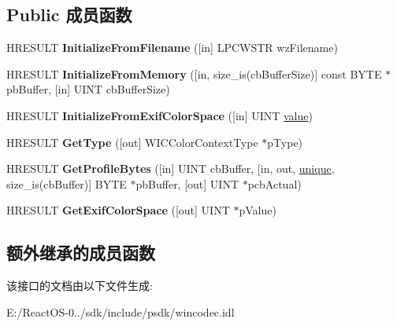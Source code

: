 \subsection*{Public 成员函数}
\begin{DoxyCompactItemize}
\item 
\mbox{\label{interface_i_w_i_c_color_context_a33b755754b61a614cfab71e7ec3b71b7}} 
H\+R\+E\+S\+U\+LT {\bfseries Initialize\+From\+Filename} (\mbox{[}in\mbox{]} L\+P\+C\+W\+S\+TR wz\+Filename)
\item 
\mbox{\label{interface_i_w_i_c_color_context_a5f5ce7e6cc3ca145ab4a6ae6b6e29629}} 
H\+R\+E\+S\+U\+LT {\bfseries Initialize\+From\+Memory} (\mbox{[}in, size\+\_\+is(cb\+Buffer\+Size)\mbox{]} const B\+Y\+TE $\ast$pb\+Buffer, \mbox{[}in\mbox{]} U\+I\+NT cb\+Buffer\+Size)
\item 
\mbox{\label{interface_i_w_i_c_color_context_a8ef3b21cf5aa20e3fb28a9942c3ac008}} 
H\+R\+E\+S\+U\+LT {\bfseries Initialize\+From\+Exif\+Color\+Space} (\mbox{[}in\mbox{]} U\+I\+NT \hyperlink{unionvalue}{value})
\item 
\mbox{\label{interface_i_w_i_c_color_context_aa76a3b69fbe11c66cfc87f72d564284a}} 
H\+R\+E\+S\+U\+LT {\bfseries Get\+Type} (\mbox{[}out\mbox{]} W\+I\+C\+Color\+Context\+Type $\ast$p\+Type)
\item 
\mbox{\label{interface_i_w_i_c_color_context_a0ebb1f6705c7f7e39c38c2f3e654e1dd}} 
H\+R\+E\+S\+U\+LT {\bfseries Get\+Profile\+Bytes} (\mbox{[}in\mbox{]} U\+I\+NT cb\+Buffer, \mbox{[}in, out, \hyperlink{interfaceunique}{unique}, size\+\_\+is(cb\+Buffer)\mbox{]} B\+Y\+TE $\ast$pb\+Buffer, \mbox{[}out\mbox{]} U\+I\+NT $\ast$pcb\+Actual)
\item 
\mbox{\label{interface_i_w_i_c_color_context_a7df7afc48ec5e0a38b4db4dc89dd07ee}} 
H\+R\+E\+S\+U\+LT {\bfseries Get\+Exif\+Color\+Space} (\mbox{[}out\mbox{]} U\+I\+NT $\ast$p\+Value)
\end{DoxyCompactItemize}
\subsection*{额外继承的成员函数}


该接口的文档由以下文件生成\+:\begin{DoxyCompactItemize}
\item 
E\+:/\+React\+O\+S-\/0../sdk/include/psdk/wincodec.\+idl\end{DoxyCompactItemize}

